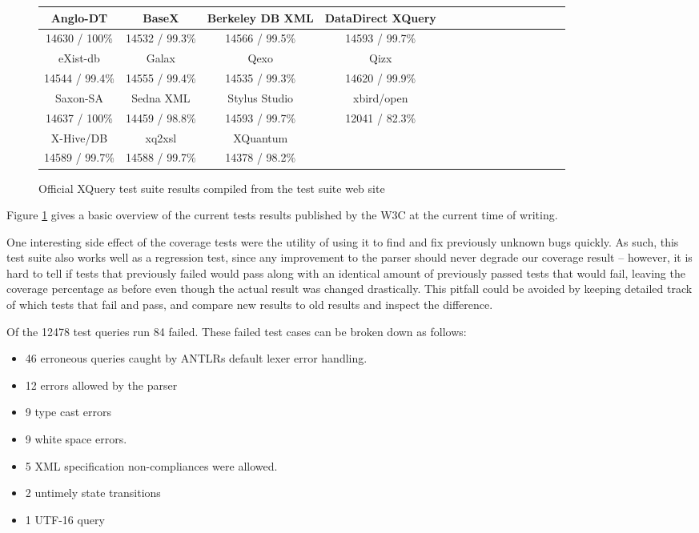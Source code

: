\begin{figure}[h!]
  \begin{center}
    \begin{tabular}{ |c | c | c | c | c | c | c | c | c | c | c | c | c | c | c | }
      \hline
      Anglo-DT        & BaseX           & Berkeley DB XML   & DataDirect XQuery \\ \hline
      14630 / 100\%   & 14532 / 99.3\%  & 14566 / 99.5\%    & 14593 / 99.7\%  \\ \hline \hline
      eXist-db        & Galax           & Qexo              & Qizx \\ \hline            
      14544 / 99.4\%  & 14555 / 99.4\%  & 14535 / 99.3\%    & 14620 / 99.9\% \\ \hline \hline
      Saxon-SA        & Sedna XML       & Stylus Studio     & xbird/open \\ \hline
      14637 / 100\%   & 14459 / 98.8\%  & 14593 / 99.7\%    & 12041 / 82.3\% \\ \hline \hline
      X-Hive/DB       & xq2xsl          & XQuantum          & \\ \hline
      14589 / 99.7\%   & 14588 / 99.7\%  & 14378 / 98.2\%    & \\ 
    \hline
    \end{tabular}
  \end{center}
  \caption[Official XQuery test suite results]{Official XQuery test suite
  results compiled from the test suite web site\cite{w3ctestresults}} 
  \label{figure:table:w3c_test_results}
\end{figure}

Figure \ref{figure:table:w3c_test_results} gives a basic overview of the current
tests results published by the W3C at the current time of writing.

One interesting side effect of the coverage tests were the utility of using it to
find and fix previously unknown bugs quickly. As such, this test suite also
works well as a regression test, since any improvement to the parser should
never degrade our coverage result -- however, it is hard to tell if tests that
previously failed would pass along with an identical amount of previously
passed tests that would fail, leaving the coverage percentage as before even
though the actual result was changed drastically. This pitfall could be
avoided by keeping detailed track of which tests that fail and pass, and compare
new results to old results and inspect the difference.

Of the 12478 test queries run 84 failed. These failed test cases can be broken
down as follows: 
\begin{itemize}
\item 46 erroneous queries caught by ANTLRs default lexer error handling.
\item 12 errors allowed by the parser
\item 9 type cast errors
\item 9 white space errors.
\item 5 XML specification non-compliances were allowed.
\item 2 untimely state transitions
\item 1 UTF-16 query
\end{itemize}

